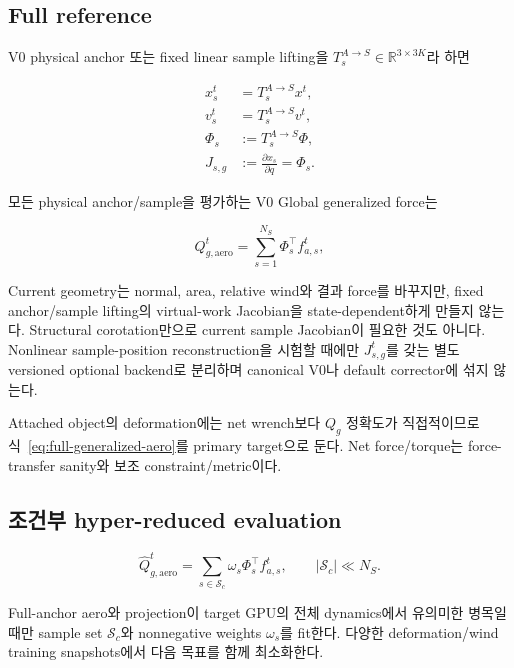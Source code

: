 \documentclass[11pt,a4paper]{article}
\newcommand{\R}{\mathbb{R}}
\begin{document}
\subsection*{Full reference}

V0 physical anchor 또는 fixed linear sample lifting을
\(T_s^{A\rightarrow S}\in\R^{3\times3K}\)라 하면

\begin{equation}
\begin{aligned}
  x_s^t&=T_s^{A\rightarrow S}x^t,\\
  v_s^t&=T_s^{A\rightarrow S}v^t,\\
  \Phi_s&:=T_s^{A\rightarrow S}\Phi,\\
  J_{s,g}&:=\frac{\partial x_s}{\partial q}=\Phi_s.
  \label{eq:fixed-global-sample-jacobian}
\end{aligned}
\end{equation}

모든 physical anchor/sample을 평가하는 V0 Global generalized force는

\begin{equation}
  Q_{g,\mathrm{aero}}^t
  =
  \sum_{s=1}^{N_S}
  \Phi_s^\top f_{a,s}^t,
  \label{eq:full-generalized-aero}
\end{equation}

Current geometry는 normal, area, relative wind와 결과 force를 바꾸지만,
fixed anchor/sample lifting의 virtual-work Jacobian을 state-dependent하게 만들지 않는다.
Structural corotation만으로 current sample Jacobian이 필요한 것도 아니다.
Nonlinear sample-position reconstruction을 시험할 때에만 \(J_{s,g}^t\)를 갖는
별도 versioned optional backend로 분리하며 canonical V0나 default corrector에 섞지 않는다.

Attached object의 deformation에는 net wrench보다 \(Q_g\) 정확도가 직접적이므로
식~\eqref{eq:full-generalized-aero}를 primary target으로 둔다.
Net force/torque는 force-transfer sanity와 보조 constraint/metric이다.

\subsection*{조건부 hyper-reduced evaluation}

\begin{equation}
  \widehat Q_{g,\mathrm{aero}}^t
  =
  \sum_{s\in\mathcal S_c}
  \omega_s
  \Phi_s^\top f_{a,s}^t,
  \qquad
  |\mathcal S_c|\ll N_S.
  \label{eq:hyper-aero}
\end{equation}

Full-anchor aero와 projection이 target GPU의 전체 dynamics에서
유의미한 병목일 때만 sample set \(\mathcal S_c\)와 nonnegative weights \(\omega_s\)를 fit한다.
다양한 deformation/wind training snapshots에서 다음 목표를 함께 최소화한다.
\end{document}
